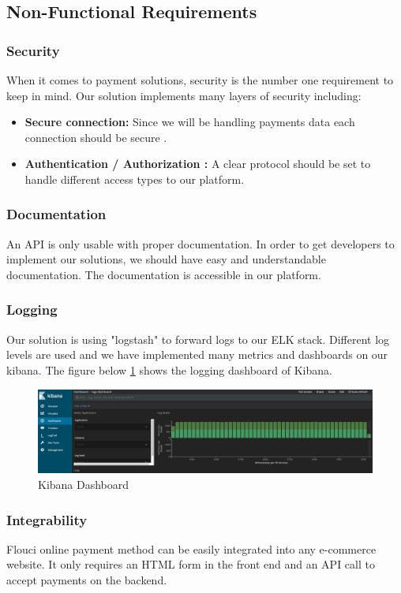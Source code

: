 \begin{spacing}{1.2}
\subsection{Non-Functional Requirements}
\subsubsection{Security}
When it comes to payment solutions, security is the number one requirement to keep in mind.
Our solution implements many layers of security including: 
\begin{itemize}
	\item \textbf{Secure connection:} Since we will be handling payments data each connection should be secure .
	\item \textbf{Authentication / Authorization :}  A clear protocol should be set to handle different access types to our platform.
    \end{itemize}
\subsubsection{Documentation}
An API is only usable with proper documentation. In order to get developers to implement our solutions, we should have easy and understandable documentation. The documentation is accessible in our platform.\subsubsection{Logging}
Our solution is using "logstash" to forward logs to our ELK\cite{ELK} stack. Different log levels are used and we have implemented many metrics and dashboards on our kibana.
The figure below \ref{fig:kibana} shows the logging dashboard of Kibana.
\begin{figure}[H]\centering
\includegraphics[scale=0.3]{ELK.png}
\caption{Kibana Dashboard}
\label{fig:kibana}
\end{figure}

\subsubsection{Integrability}
Flouci online payment method can be easily integrated into any e-commerce website. It only requires an HTML form in the front end and an API call to accept payments on the backend.


\end{spacing}
